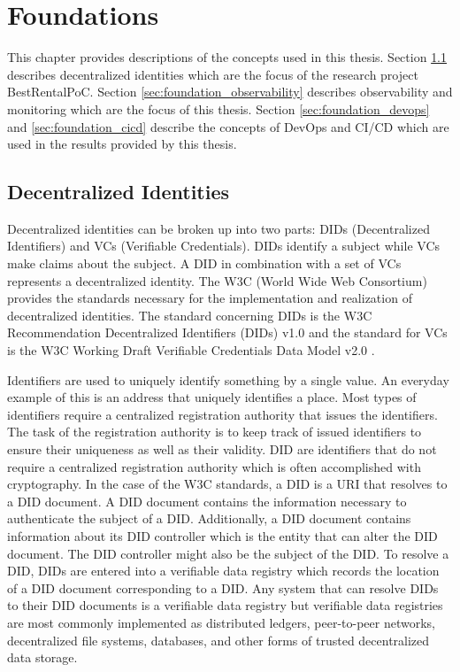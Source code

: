\chapter{Foundations}
\label{cha:foundations}

This chapter provides descriptions of the concepts used in this thesis.
Section \ref{sec:foundation_decentralized_identities} describes decentralized identities
which are the focus of the research project BestRentalPoC.
Section \ref{sec:foundation_observability} describes observability and monitoring which are
the focus of this thesis.
Section \ref{sec:foundation_devops} and \ref{sec:foundation_cicd} describe the concepts
of DevOps and CI/CD which are used in the results provided by this thesis.

\section{Decentralized Identities}
\label{sec:foundation_decentralized_identities}

Decentralized identities can be broken up into two parts: DIDs (Decentralized Identifiers) and VCs (Verifiable Credentials).
DIDs identify a subject while VCs make claims about the subject. A DID in combination with a set of VCs represents
a decentralized identity.
The W3C (World Wide Web Consortium) provides the standards necessary for the implementation and realization
of decentralized identities.
The standard concerning DIDs is the W3C Recommendation Decentralized Identifiers (DIDs) v1.0 \cite{W3C-DID}
and the standard for VCs is the W3C Working Draft Verifiable Credentials Data Model v2.0 \cite{W3C-VC}.

Identifiers are used to uniquely identify something by a single value.
An everyday example of this is an address that uniquely identifies a place.
Most types of identifiers require a centralized registration authority that issues the identifiers.
The task of the registration authority is to keep track of issued identifiers to ensure their uniqueness
as well as their validity. DID are identifiers that do not require
a centralized registration authority which is often accomplished with cryptography.
In the case of the W3C standards, a DID is a URI that resolves to a DID document.
A DID document contains the information necessary to authenticate the subject of a DID.
Additionally, a DID document contains information about its DID controller which is the entity
that can alter the DID document. The DID controller might also be the subject of the DID.
To resolve a DID, DIDs are entered into a verifiable data registry which records the location
of a DID document corresponding to a DID. Any system that can resolve DIDs to their DID documents
is a verifiable data registry but verifiable data registries are most commonly implemented as
distributed ledgers, peer-to-peer networks, decentralized file systems, databases, and other
forms of trusted decentralized data storage.

